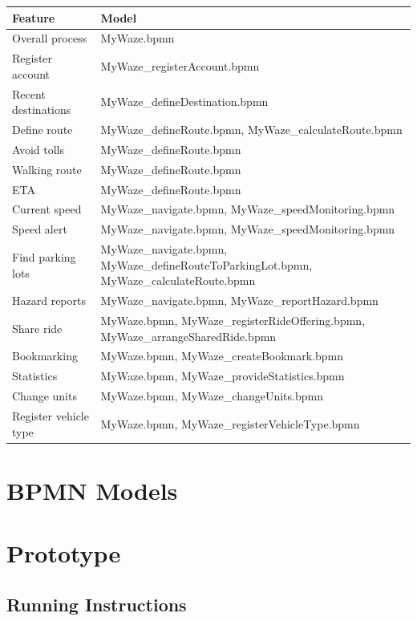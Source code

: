 \documentclass{article}
\begin{document}
\begin{longtable}{|>{\raggedright}p{}|>{\raggedright\arraybackslash}p{}|}
\hline
\textbf{Feature} & \textbf{Model} \\
\hline
Overall process & MyWaze.bpmn \\
\hline
Register account & MyWaze\_registerAccount.bpmn \\
\hline
Recent destinations & MyWaze\_defineDestination.bpmn \\
\hline
Define route & MyWaze\_defineRoute.bpmn, MyWaze\_calculateRoute.bpmn \\
\hline
Avoid tolls & MyWaze\_defineRoute.bpmn \\
\hline
Walking route & MyWaze\_defineRoute.bpmn \\
\hline
ETA & MyWaze\_defineRoute.bpmn \\
\hline
Current speed & MyWaze\_navigate.bpmn, MyWaze\_speedMonitoring.bpmn \\
\hline
Speed alert & MyWaze\_navigate.bpmn, MyWaze\_speedMonitoring.bpmn \\
\hline
Find parking lots & MyWaze\_navigate.bpmn, MyWaze\_defineRouteToParkingLot.bpmn, MyWaze\_calculateRoute.bpmn \\
\hline
Hazard reports & MyWaze\_navigate.bpmn, MyWaze\_reportHazard.bpmn \\
\hline
Share ride & MyWaze.bpmn, MyWaze\_registerRideOffering.bpmn, MyWaze\_arrangeSharedRide.bpmn \\
\hline
Bookmarking & MyWaze.bpmn, MyWaze\_createBookmark.bpmn \\
\hline
Statistics & MyWaze.bpmn, MyWaze\_provideStatistics.bpmn \\
\hline
Change units & MyWaze.bpmn, MyWaze\_changeUnits.bpmn \\
\hline
Register vehicle type & MyWaze.bpmn, MyWaze\_registerVehicleType.bpmn \\
\hline
\end{longtable}

\section*{BPMN Models}


  
\clearpage

\section*{Prototype}
\subsection*{Running Instructions}
\end{document}
